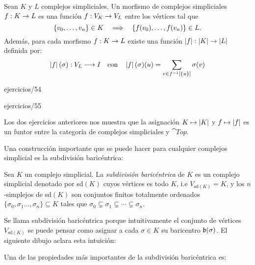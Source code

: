 \documentclass[../../topologia_algebraica]{subfiles}
\begin{document}
\begin{defin}
	Sean $K$ y $L$ complejos simpliciales. Un morfismo de complejos simpliciales $f:K\rightarrow L$
	es una funci\'on $f:V_K\rightarrow V_L$ entre los v\'ertices tal que
	\[
		\{v_0,\ldots,v_n\}\in K \quad\Longrightarrow\quad \{f(v_0),\ldots,f(v_n)\}\in L.
	\]
	Adem\'as, para cada morfismo $f:K\rightarrow L$ existe una funci\'on $\left| f \right|:\left| K \right|\rightarrow\left| L \right|$
	definida por:
	\[
		\left| f \right|(\sigma):V_L \longrightarrow I \quad\text{con}\quad
		\left| f \right|(\sigma)(u)=\sum_{v\in f^{-1}[\{u\}]}\sigma(v)
	\]
\end{defin}

{ejercicios/54} %

{ejercicios/55} %

\begin{nota}
	Los dos ejercicios anteriores nos muestra que la asignaci\'on $K \mapsto \left| K \right|$ y $f\mapsto \left| f \right|$
	es un funtor entre la categor\'ia de complejos simpliciales y $\cat{Top}$.
\end{nota}

Una construcci\'on importante que se puede hacer para cualquier complejos simplicial es la
subdivisi\'on baric\'entrica:

\begin{defin}
	Sea $K$ un complejo simplicial. La \emph{subdivisi\'on baric\'entrica} de $K$ es un complejo
	simplicial denotado por sd$(K)$ cuyos v\'ertices es todo $K$, i.e $V_{\text{sd}(K)}=K$, y los
	$n$-simplejos de sd$(K)$ son conjuntos finitos totalmente ordenados
	$\{\sigma_0,\sigma_1\ldots,\sigma_n\}\subseteq K$ tales que
	$\sigma_0\subsetneq\sigma_1\subsetneq\cdots\subsetneq\sigma_n$.
\end{defin}

Se llama subdivisi\'on baric\'entrica porque intuitivamente el conjunto de v\'ertices $V_{\text{sd}(K)}$
se puede pensar como asignar a cada $\sigma\in K$ su baricentro $\mathfrak{b}(\sigma)$. El siguiente dibujo
aclara esta intuici\'on:

\begin{figure}[h!]%
  \centering
\end{figure}%

Una de las propiedades m\'as importantes de la subdivisi\'on baric\'entrica es:
\end{document}
